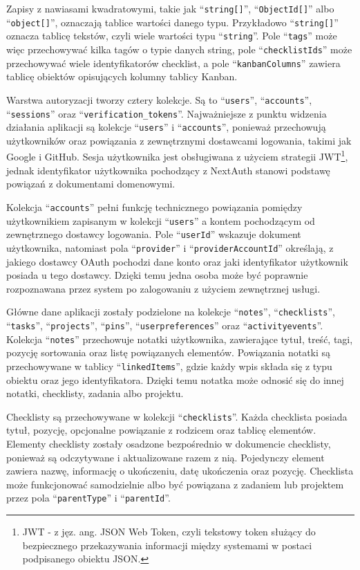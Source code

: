 \documentclass[12pt,a4paper,twoside]{report}
\begin{document}
Zapisy z nawiasami kwadratowymi, takie jak ``\texttt{string[]}'', ``\texttt{ObjectId[]}'' albo ``\texttt{object[]}'', oznaczają tablice wartości danego typu. Przykładowo ``\texttt{string[]}'' oznacza tablicę tekstów, czyli wiele wartości typu ``\texttt{string}''. Pole ``\texttt{tags}'' może więc przechowywać kilka tagów o typie danych string, pole ``\texttt{checklistIds}'' może przechowywać wiele identyfikatorów checklist, a pole ``\texttt{kanbanColumns}'' zawiera tablicę obiektów opisujących kolumny tablicy Kanban.

Warstwa autoryzacji tworzy cztery kolekcje. Są to ``\texttt{users}'', ``\texttt{accounts}'', ``\texttt{sessions}'' oraz ``\texttt{verification\_tokens}''. Najważniejsze z punktu widzenia działania aplikacji są kolekcje ``\texttt{users}'' i ``\texttt{accounts}'', ponieważ przechowują użytkowników oraz powiązania z zewnętrznymi dostawcami logowania, takimi jak Google i GitHub. Sesja użytkownika jest obsługiwana z użyciem strategii JWT\footnote{JWT - z jęz. ang. JSON Web Token, czyli tekstowy token służący do bezpiecznego przekazywania informacji między systemami w postaci podpisanego obiektu JSON.}, jednak identyfikator użytkownika pochodzący z NextAuth stanowi podstawę powiązań z dokumentami domenowymi.

Kolekcja ``\texttt{accounts}'' pełni funkcję technicznego powiązania pomiędzy użytkownikiem zapisanym w kolekcji ``\texttt{users}'' a kontem pochodzącym od zewnętrznego dostawcy logowania. Pole ``\texttt{userId}'' wskazuje dokument użytkownika, natomiast pola ``\texttt{provider}'' i ``\texttt{providerAccountId}'' określają, z jakiego dostawcy OAuth pochodzi dane konto oraz jaki identyfikator użytkownik posiada u tego dostawcy. Dzięki temu jedna osoba może być poprawnie rozpoznawana przez system po zalogowaniu z użyciem zewnętrznej usługi.

Główne dane aplikacji zostały podzielone na kolekcje ``\texttt{notes}'', ``\texttt{checklists}'', ``\texttt{tasks}'', ``\texttt{projects}'', ``\texttt{pins}'', ``\texttt{userpreferences}'' oraz ``\texttt{activityevents}''. Kolekcja ``\texttt{notes}'' przechowuje notatki użytkownika, zawierające tytuł, treść, tagi, pozycję sortowania oraz listę powiązanych elementów. Powiązania notatki są przechowywane w tablicy ``\texttt{linkedItems}'', gdzie każdy wpis składa się z typu obiektu oraz jego identyfikatora. Dzięki temu notatka może odnosić się do innej notatki, checklisty, zadania albo projektu.

Checklisty są przechowywane w kolekcji ``\texttt{checklists}''. Każda checklista posiada tytuł, pozycję, opcjonalne powiązanie z rodzicem oraz tablicę elementów. Elementy checklisty zostały osadzone bezpośrednio w dokumencie checklisty, ponieważ są odczytywane i aktualizowane razem z nią. Pojedynczy element zawiera nazwę, informację o ukończeniu, datę ukończenia oraz pozycję. Checklista może funkcjonować samodzielnie albo być powiązana z zadaniem lub projektem przez pola ``\texttt{parentType}'' i ``\texttt{parentId}''.
\end{document}

